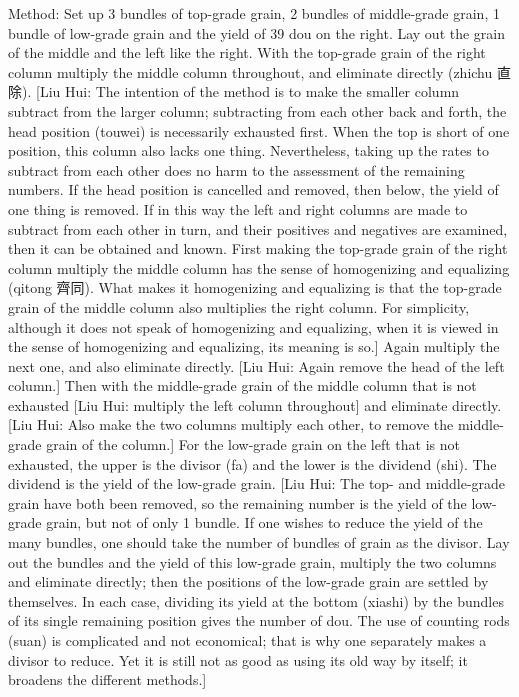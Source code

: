 \documentclass[11pt]{article}
\newenvironment{uniten}{\par\small\color{black!85}}{\par\medskip}
\begin{document}
\begin{uniten}Method: Set up 3 bundles of top-grade grain, 2 bundles of middle-grade grain, 1 bundle of low-grade grain and the yield of 39 dou on the right. Lay out the grain of the middle and the left like the right. With the top-grade grain of the right column multiply the middle column throughout, and eliminate directly (zhichu 直除). [Liu Hui: The intention of the method is to make the smaller column subtract from the larger column; subtracting from each other back and forth, the head position (touwei) is necessarily exhausted first. When the top is short of one position, this column also lacks one thing. Nevertheless, taking up the rates to subtract from each other does no harm to the assessment of the remaining numbers. If the head position is cancelled and removed, then below, the yield of one thing is removed. If in this way the left and right columns are made to subtract from each other in turn, and their positives and negatives are examined, then it can be obtained and known. First making the top-grade grain of the right column multiply the middle column has the sense of homogenizing and equalizing (qitong 齊同). What makes it homogenizing and equalizing is that the top-grade grain of the middle column also multiplies the right column. For simplicity, although it does not speak of homogenizing and equalizing, when it is viewed in the sense of homogenizing and equalizing, its meaning is so.] Again multiply the next one, and also eliminate directly. [Liu Hui: Again remove the head of the left column.] Then with the middle-grade grain of the middle column that is not exhausted [Liu Hui: multiply the left column throughout] and eliminate directly. [Liu Hui: Also make the two columns multiply each other, to remove the middle-grade grain of the column.] For the low-grade grain on the left that is not exhausted, the upper is the divisor (fa) and the lower is the dividend (shi). The dividend is the yield of the low-grade grain. [Liu Hui: The top- and middle-grade grain have both been removed, so the remaining number is the yield of the low-grade grain, but not of only 1 bundle. If one wishes to reduce the yield of the many bundles, one should take the number of bundles of grain as the divisor. Lay out the bundles and the yield of this low-grade grain, multiply the two columns and eliminate directly; then the positions of the low-grade grain are settled by themselves. In each case, dividing its yield at the bottom (xiashi) by the bundles of its single remaining position gives the number of dou. The use of counting rods (suan) is complicated and not economical; that is why one separately makes a divisor to reduce. Yet it is still not as good as using its old way by itself; it broadens the different methods.]\end{uniten}
\end{document}
